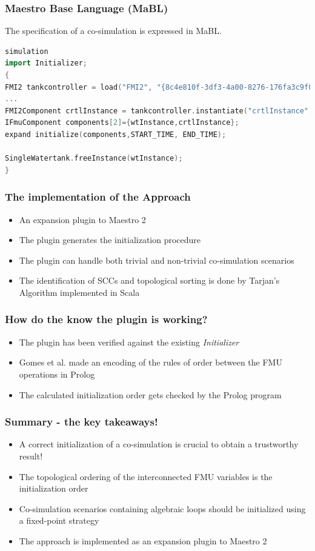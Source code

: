 \documentclass{beamer}
\begin{document}
\begin{frame}[fragile]
\frametitle{Maestro Base Language (MaBL)}
The specification of a co-simulation is expressed in MaBL.

\begin{lstlisting}[language=C++]
simulation
import Initializer;
{
FMI2 tankcontroller = load("FMI2", "{8c4e810f-3df3-4a00-8276-176fa3c9f000}", "src/test/resources/watertankcontroller-c.fmu");
...
FMI2Component crtlInstance = tankcontroller.instantiate("crtlInstance", false, false);;
IFmuComponent components[2]={wtInstance,crtlInstance};
expand initialize(components,START_TIME, END_TIME);

SingleWatertank.freeInstance(wtInstance);
}
\end{lstlisting}
\end{frame}


\begin{frame}
\frametitle{The implementation of the Approach}
\begin{itemize}
    \item An expansion plugin to Maestro 2
    \item The plugin generates the initialization procedure
    \item The plugin can handle both trivial and non-trivial co-simulation scenarios
    \item The identification of SCCs and topological sorting is done by Tarjan's Algorithm implemented in Scala
\end{itemize}
\end{frame}

\begin{frame}
\frametitle{How do the know the plugin is working?}
\begin{itemize}
    \item The plugin has been verified against the existing \textit{Initializer}
    \item Gomes et al. made an encoding of the rules of order between the FMU operations in Prolog
    \item The calculated initialization order gets checked by the Prolog program
\end{itemize}
\end{frame}


\begin{frame}
\frametitle{Summary - the key takeaways!}
\begin{itemize}
    \item A correct initialization of a co-simulation is crucial to obtain a trustworthy result!
    \item The topological ordering of the interconnected FMU variables  is the initialization order
    \item Co-simulation scenarios containing algebraic loops should be initialized using a fixed-point strategy
    \item The approach is implemented as an expansion plugin to Maestro 2  
\end{itemize}
\end{frame}
\end{document}

